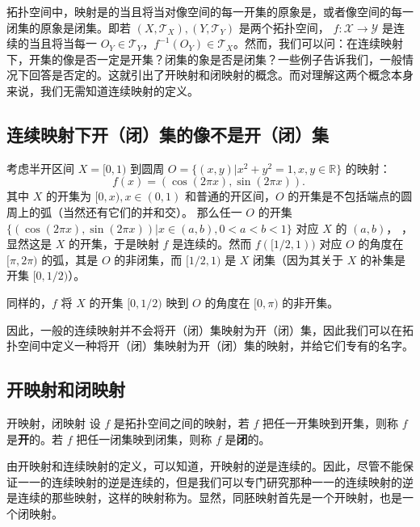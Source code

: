 
拓扑空间中，映射是的当且将当对像空间的每一开集的原象是，或者像空间的每一闭集的原象是闭集。即若 $(X,\mathcal T_X),(Y,\mathcal T_Y)$ 是两个拓扑空间， $f:\mathcal X\rightarrow\mathcal Y$ 是连续的当且将当每一 $O_Y\in\mathcal T_Y$，$f^{-1}(O_Y)\in\mathcal T_X$。然而，我们可以问：在连续映射下，开集的像是否一定是开集？闭集的象是否是闭集？一些例子告诉我们，一般情况下回答是否定的。这就引出了开映射和闭映射的概念。而对理解这两个概念本身来说，我们无需知道连续映射的定义。

\subsection{连续映射下开（闭）集的像不是开（闭）集}
\begin{example}{}
考虑半开区间 $X=[0,1)$ 到圆周 $O=\{(x,y)|x^2+y^2=1,x,y\in\mathbb R\}$ 的映射：
\begin{equation}
f(x)=(\cos(2\pi x),\sin(2\pi x)).~
\end{equation}
其中 $X$ 的开集为 $[0,x),x\in (0,1)$ 和普通的开区间，$O$ 的开集是不包括端点的圆周上的弧（当然还有它们的并和交）。
那么任一 $O$ 的开集 $\{(\cos(2\pi x),\sin(2\pi x))|x\in(a,b),0<a<b<1\}$ 对应 $X$ 的 $(a,b)$，
，显然这是 $X$ 的开集，于是映射 $f$ 是连续的。然而 $f([1/2,1))$ 对应 $O$ 的角度在 $[\pi,2\pi)$ 的弧，其是 $O$ 的非闭集，而 $[1/2,1)$ 是 $X$ 闭集（因为其关于 $X$ 的补集是开集 $[0,1/2)$）。

同样的，$f$ 将 $X$ 的开集 $[0,1/2)$ 映到 $O$ 的角度在 $[0,\pi)$ 的非开集。
\end{example}

因此，一般的连续映射并不会将开（闭）集映射为开（闭）集，因此我们可以在拓扑空间中定义一种将开（闭）集映射为开（闭）集的映射，并给它们专有的名字。

\subsection{开映射和闭映射}

\begin{definition}{开映射，闭映射}
设 $f$ 是拓扑空间之间的映射，若 $f$ 把任一开集映到开集，则称 $f$ 是\textbf{开}的。若 $f$ 把任一闭集映到闭集，则称 $f$ 是\textbf{闭}的。
\end{definition}

由开映射和连续映射的定义，可以知道，开映射的逆是连续的。因此，尽管不能保证一一的连续映射的逆是连续的，但是我们可以专门研究那种一一的连续映射的逆是连续的那些映射，这样的映射称为。显然，同胚映射首先是一个开映射，也是一个闭映射。




